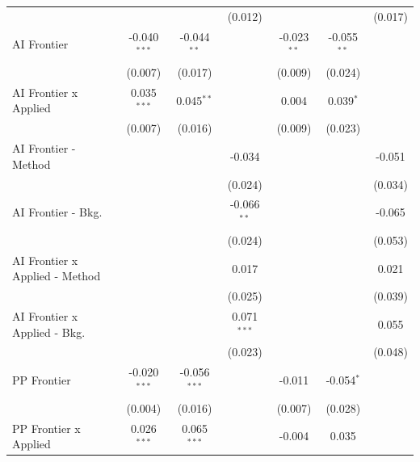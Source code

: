 \begin{tabular}{lcccccc}
                                  &                &                & (0.012)        &                &                & (0.017)\\   
   AI Frontier                    & -0.040$^{***}$ & -0.044$^{**}$  &                & -0.023$^{**}$  & -0.055$^{**}$  &   \\   
                                  & (0.007)        & (0.017)        &                & (0.009)        & (0.024)        &   \\   
   AI Frontier x Applied          & 0.035$^{***}$  & 0.045$^{**}$   &                & 0.004          & 0.039$^{*}$    &   \\   
                                  & (0.007)        & (0.016)        &                & (0.009)        & (0.023)        &   \\   
   AI Frontier - Method           &                &                & -0.034         &                &                & -0.051\\   
                                  &                &                & (0.024)        &                &                & (0.034)\\   
   AI Frontier - Bkg.             &                &                & -0.066$^{**}$  &                &                & -0.065\\   
                                  &                &                & (0.024)        &                &                & (0.053)\\   
   AI Frontier x Applied - Method &                &                & 0.017          &                &                & 0.021\\   
                                  &                &                & (0.025)        &                &                & (0.039)\\   
   AI Frontier x Applied - Bkg.   &                &                & 0.071$^{***}$  &                &                & 0.055\\   
                                  &                &                & (0.023)        &                &                & (0.048)\\   
   PP Frontier                    & -0.020$^{***}$ & -0.056$^{***}$ &                & -0.011         & -0.054$^{*}$   &   \\   
                                  & (0.004)        & (0.016)        &                & (0.007)        & (0.028)        &   \\   
   PP Frontier x Applied          & 0.026$^{***}$  & 0.065$^{***}$  &                & -0.004         & 0.035          &   \\   

\end{tabular}

